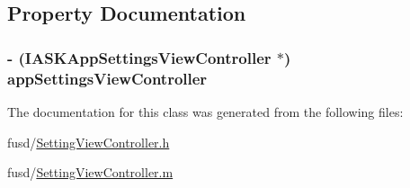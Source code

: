 \subsection{\-Property \-Documentation}
\hypertarget{interface_setting_view_controller_ab3dc108801289aadfd59ef525a43daa2}{
\subsubsection[{app\-Settings\-View\-Controller}]{\setlength{\rightskip}{0pt plus 5cm}-\/ (\-I\-A\-S\-K\-App\-Settings\-View\-Controller $\ast$) app\-Settings\-View\-Controller}}
\label{interface_setting_view_controller_ab3dc108801289aadfd59ef525a43daa2}


\-The documentation for this class was generated from the following files\-:\begin{DoxyCompactItemize}
\item 
fusd/\hyperlink{_setting_view_controller_8h}{\-Setting\-View\-Controller.\-h}\item 
fusd/\hyperlink{_setting_view_controller_8m}{\-Setting\-View\-Controller.\-m}\end{DoxyCompactItemize}
